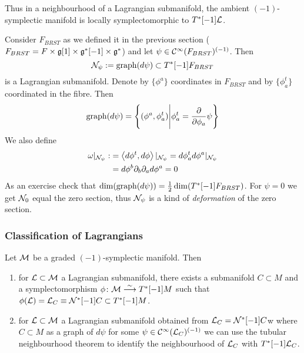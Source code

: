 Thus in a neighbourhood of a Lagrangian submanifold, the ambient $(-1)$-symplectic manifold is locally symplectomorphic to $T^*[-1]\mathcal{L}$.

\begin{example}
  Consider $F_{BRST}$ as we defined it in the previous section ($F_{BRST} = F \times \mathfrak{g}[1] \times \mathfrak{g}^*[-1] \times \mathfrak{g}^*$) and let $\psi \in \mathcal{C}^{\infty}(F_{BRST})^{(-1)}$. Then
  \begin{equation}
    \mathcal{N}_\psi := \operatorname{graph}(d \psi) \subset T^*[-1]F_{BRST}
  \end{equation}
  is a Lagrangian submanifold. Denote by $\{\phi^a\}$ coordinates in $F_{BRST}$ and by $\{\phi^t_a\}$ coordinated in the fibre. Then
  \begin{equation}
    \graph(d \psi) = \left\{ (\phi^a, \phi^t_a) \Bigg| \phi^t_a = \dell{}{\phi_a} \psi \right\}
  \end{equation}
  We also define
  \begin{align}
    \omega |_{\NC_\psi} :&= \pair{d\phi^t}{d\phi} |_{\NC_\psi} = d \phi^t_a d\phi^a |_{\NC_\psi} \\
    &= d\phi^b \partial_b \partial_a d\phi^a = 0
  \end{align}
  As an exercise check that $\dim(\operatorname{graph}(d \psi)) = \frac{1}{2} \dim(T^*[-1]F_{BRST})$. For $\psi = 0$ we get $\mathcal{N}_0$ equal the zero section, thus $\mathcal{N}_\psi$ is a kind of \emph{deformation} of the zero section.
\end{example}

\subsubsection{Classification of Lagrangians}

Let $\mathcal{M}$ be a graded $(-1)$-symplectic manifold. Then
\begin{enumerate}
  \item for $\mathcal{L} \subset \mathcal{M}$ a Lagrangian submanifold, there exists a submanifold $C \subset M$ and a symplectomorphism $\phi \colon \MM \atob{\sim} T^*[-1]M$ such that $\phi(\LL) = \LL_C \equiv \NC^*[-1] C \subset T^*[-1]M$.

  \item for $\mathcal{L} \subset \mathcal{M}$ a Lagrangian submanifold obtained from $\mathcal{L}_C = \mathcal{N}^*[-1] C$w where $C \subset M$ as a graph of $d\psi$ for some $\psi \in \mathcal{C}^{\infty}(\mathcal{L}_C)^{(-1)}$ we can use the tubular neighbourhood theorem to identify the neighbourhood of $\mathcal{L}_C$ with $T^*[-1]\mathcal{L}_C$.
\end{enumerate}

